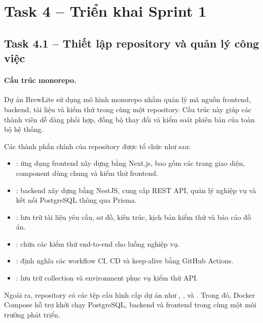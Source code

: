 

\section{Task 4 -- Triển khai Sprint 1}

\subsection{Task 4.1 -- Thiết lập repository và quản lý công việc}

\paragraph{Cấu trúc monorepo.}
Dự án BrewLite sử dụng mô hình monorepo nhằm quản lý mã nguồn frontend,
backend, tài liệu và kiểm thử trong cùng một repository. Cấu trúc này
giúp các thành viên dễ dàng phối hợp, đồng bộ thay đổi và kiểm soát
phiên bản của toàn bộ hệ thống.

Các thành phần chính của repository được tổ chức như sau:

\begin{itemize}
    \item {}: ứng dụng frontend xây dựng bằng Next.js,
    bao gồm các trang giao diện, component dùng chung và kiểm thử frontend.
    \item {}: backend xây dựng bằng NestJS, cung cấp REST API,
    quản lý nghiệp vụ và kết nối PostgreSQL thông qua Prisma.
    \item {}: lưu trữ tài liệu yêu cầu, sơ đồ, kiến trúc,
    kịch bản kiểm thử và báo cáo đồ án.
    \item {}: chứa các kiểm thử end-to-end cho luồng nghiệp vụ.
    \item {}: định nghĩa các workflow CI, CD
    và keep-alive bằng GitHub Actions.
    \item {}: lưu trữ collection và environment phục vụ
    kiểm thử API.
\end{itemize}

Ngoài ra, repository có các tệp cấu hình cấp dự án như
, ,  và
. Trong đó, Docker Compose hỗ trợ khởi chạy
PostgreSQL, backend và frontend trong cùng một môi trường phát triển.

